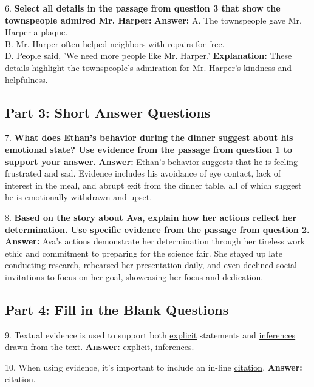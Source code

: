 \documentclass[12pt]{article}
\begin{document}
\vspace{1cm}
6. \textbf{Select all details in the passage from question 3 that show the townspeople admired Mr. Harper:}  
\textbf{Answer:} A. The townspeople gave Mr. Harper a plaque. \\
B. Mr. Harper often helped neighbors with repairs for free. \\
D. People said, 'We need more people like Mr. Harper.'  
\textbf{Explanation:} These details highlight the townspeople's admiration for Mr. Harper’s kindness and helpfulness.

\subsection*{Part 3: Short Answer Questions}

7. \textbf{What does Ethan’s behavior during the dinner suggest about his emotional state? Use evidence from the passage from question 1 to support your answer.}  
\textbf{Answer:} Ethan’s behavior suggests that he is feeling frustrated and sad. Evidence includes his avoidance of eye contact, lack of interest in the meal, and abrupt exit from the dinner table, all of which suggest he is emotionally withdrawn and upset.

\vspace{1cm}
8. \textbf{Based on the story about Ava, explain how her actions reflect her determination. Use specific evidence from the passage from question 2.}  
\textbf{Answer:} Ava’s actions demonstrate her determination through her tireless work ethic and commitment to preparing for the science fair. She stayed up late conducting research, rehearsed her presentation daily, and even declined social invitations to focus on her goal, showcasing her focus and dedication.

\subsection*{Part 4: Fill in the Blank Questions}

9. Textual evidence is used to support both \underline{explicit} statements and \underline{inferences} drawn from the text.  
\textbf{Answer:} explicit, inferences.

10. When using evidence, it's important to include an in-line \underline{citation}.  
\textbf{Answer:} citation.
\end{document}
